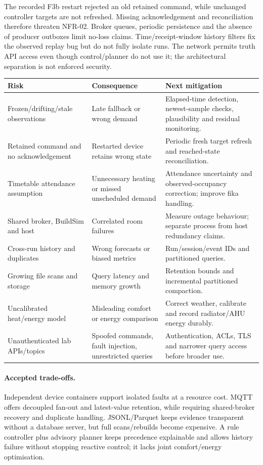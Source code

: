 \documentclass[11pt,a4paper]{article}
\begin{document}
The recorded F3b restart rejected an old retained command, while unchanged controller targets are not refreshed. Missing acknowledgement and reconciliation therefore threaten NFR-02. Broker queues, periodic persistence and the absence of producer outboxes limit no-loss claims. Time/receipt-window history filters fix the observed replay bug but do not fully isolate runs. The network permits truth API access even though control/planner do not use it; the architectural separation is not enforced security.

{\small\begin{longtable}{p{36mm}p{52mm}p{56mm}}\toprule Risk & Consequence & Next mitigation\\\midrule\endhead
Frozen/drifting/stale observations & Late fallback or wrong demand & Elapsed-time detection, newest-sample checks, plausibility and residual monitoring.\\
Retained command and no acknowledgement & Restarted device retains wrong state & Periodic fresh target refresh and reached-state reconciliation.\\
Timetable attendance assumption & Unnecessary heating or missed unscheduled demand & Attendance uncertainty and observed-occupancy correction; improve fika handling.\\
Shared broker, BuildSim and host & Correlated room failures & Measure outage behaviour; separate process from host redundancy claims.\\
Cross-run history and duplicates & Wrong forecasts or biased metrics & Run/session/event IDs and partitioned queries.\\
Growing file scans and storage & Query latency and memory growth & Retention bounds and incremental partitioned compaction.\\
Uncalibrated heat/energy model & Misleading comfort or energy comparison & Correct weather, calibrate and record radiator/AHU energy durably.\\
Unauthenticated lab APIs/topics & Spoofed commands, fault injection, unrestricted queries & Authentication, ACLs, TLS and narrower query access before broader use.\\\bottomrule\end{longtable}}

\paragraph{Accepted trade-offs.}
Independent device containers support isolated faults at a resource cost. MQTT offers decoupled fan-out and latest-value retention, while requiring shared-broker recovery and duplicate handling. JSONL/Parquet keeps evidence transparent without a database server, but full scans/rebuilds become expensive. A rule controller plus advisory planner keeps precedence explainable and allows history failure without stopping reactive control; it lacks joint comfort/energy optimisation.
\end{document}
